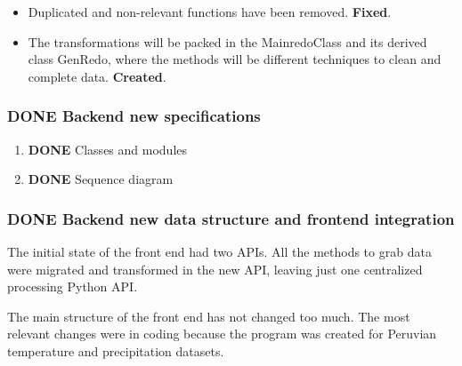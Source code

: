 \documentclass[a4paper]{article}
\begin{document}
\begin{itemize}
\item Duplicated and non-relevant functions have been removed. \textbf{Fixed}.

\item The transformations will be packed in the MainredoClass and its derived class GenRedo, where the methods will be different techniques to clean and complete data. \textbf{Created}.
\end{itemize}

\sffamily \footnotesize
\begin{center}

\end{center}
\rmfamily \normalsize

\subsubsection{{\bfseries\sffamily DONE} Backend new specifications}
\label{sec:org1ca0b0c}

\begin{enumerate}
\item {\bfseries\sffamily DONE} Classes and modules
\label{sec:orgaa92fb4}

\sffamily \footnotesize
\begin{center}

\end{center}
\rmfamily \normalsize

\item {\bfseries\sffamily DONE} Sequence diagram
\label{sec:orgfa88d13}

\sffamily \scriptsize
\begin{center}

\end{center}
\rmfamily \normalsize
\end{enumerate}

\subsubsection{{\bfseries\sffamily DONE} Backend new data structure and frontend integration}
\label{sec:org487bdf4}

The initial state of the front end had two APIs. All the methods to grab data were migrated and transformed in the new API, leaving just one centralized processing Python API.

The main structure of the front end has not changed too much. The most relevant changes were in coding because the program was created for Peruvian temperature and precipitation datasets.
\end{document}
